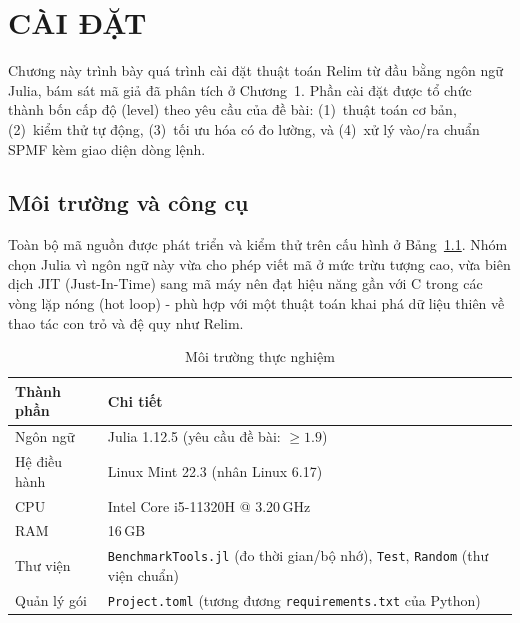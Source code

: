 \documentclass[12pt,a4paper]{report}
\begin{document}
\chapter{CÀI ĐẶT}

Chương này trình bày quá trình cài đặt thuật toán Relim từ đầu bằng ngôn ngữ
Julia, bám sát mã giả đã phân tích ở Chương~1. Phần cài đặt được tổ chức thành
bốn cấp độ (level) theo yêu cầu của đề bài: (1)~thuật toán cơ bản, (2)~kiểm thử
tự động, (3)~tối ưu hóa có đo lường, và (4)~xử lý vào/ra chuẩn SPMF kèm giao
diện dòng lệnh.

\section{Môi trường và công cụ}

Toàn bộ mã nguồn được phát triển và kiểm thử trên cấu hình ở
Bảng~\ref{tab:env}. Nhóm chọn Julia vì ngôn ngữ này vừa cho phép viết mã ở mức
trừu tượng cao, vừa biên dịch JIT (Just-In-Time) sang mã máy nên đạt hiệu năng
gần với C trong các vòng lặp nóng (hot loop) - phù hợp với một thuật toán khai
phá dữ liệu thiên về thao tác con trỏ và đệ quy như Relim.

\begin{table}[H]
    \centering
    \caption{Môi trường thực nghiệm}
    \label{tab:env}
    \begin{tabularx}{\textwidth}{|l|X|}
        \hline
        \textbf{Thành phần} & \textbf{Chi tiết} \\
        \hline
        Ngôn ngữ        & Julia 1.12.5 (yêu cầu đề bài: $\geq 1.9$) \\
        \hline
        Hệ điều hành    & Linux Mint 22.3 (nhân Linux 6.17) \\
        \hline
        CPU             & Intel Core i5-11320H @ 3.20\,GHz \\
        \hline
        RAM             & 16\,GB \\
        \hline
        Thư viện        & \texttt{BenchmarkTools.jl} (đo thời gian/bộ nhớ),
                          \texttt{Test}, \texttt{Random} (thư viện chuẩn) \\
        \hline
        Quản lý gói     & \texttt{Project.toml} (tương đương
                          \texttt{requirements.txt} của Python) \\
        \hline
    \end{tabularx}
\end{table}
\end{document}
